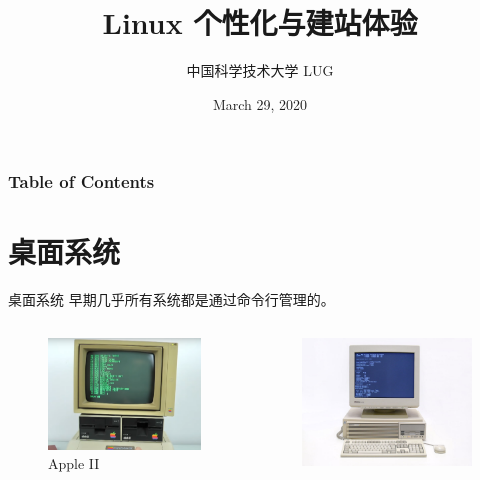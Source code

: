 \documentclass[UTF8]{ctexbeamer}
\title{Linux 个性化与建站体验}
\author{中国科学技术大学 LUG}
\date{March 29, 2020}
\begin{document}
\frame{\titlepage}
\begin{frame}
	\frametitle{Table of Contents}
	\tableofcontents
\end{frame}

\section{桌面系统}
\begin{frame}{桌面系统}
    早期几乎所有系统都是通过命令行管理的。
    
    \begin{columns}
        \begin{figure}
            \centering
            \includegraphics[width=\textwidth]{apple.png}
            \caption{Apple II}
            \label{fig:appleii}
        \end{figure}
        \begin{figure}
            \centering
            \includegraphics[width=\textwidth]{dell.png}

\end{figure}
\end{columns}
\end{frame}
\end{document}
